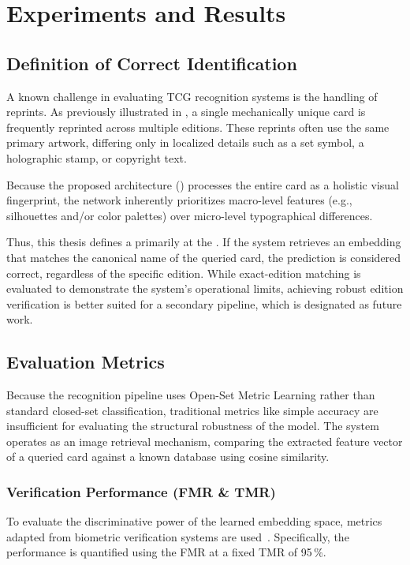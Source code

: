 \chapter{Experiments and Results}\label{chap:er}

\section{Definition of Correct Identification}\label{sec:identity_definition}
A known challenge in evaluating \ac{TCG} recognition systems is the handling of reprints. As previously illustrated in , a single mechanically unique card is frequently reprinted across multiple editions. These reprints often use the same primary artwork, differing only in localized details such as a set symbol, a holographic stamp, or copyright text.

Because the proposed architecture () processes the entire card as a holistic visual fingerprint, the network inherently prioritizes macro-level features (e.g., silhouettes and/or color palettes) over micro-level typographical differences.

Thus, this thesis defines a  primarily at the . If the system retrieves an embedding that matches the canonical name of the queried card, the prediction is considered correct, regardless of the specific edition. While exact-edition matching is evaluated to demonstrate the system's operational limits, achieving robust edition verification is better suited for a secondary pipeline, which is designated as future work.

\section{Evaluation Metrics}
Because the recognition pipeline uses Open-Set Metric Learning rather than standard closed-set classification, traditional metrics like simple accuracy are insufficient for evaluating the structural robustness of the model. The system operates as an image retrieval mechanism, comparing the extracted feature vector of a queried card against a known database using cosine similarity.

\subsection{Verification Performance (\acs{FMR} \& \acs{TMR})}
To evaluate the discriminative power of the learned embedding space, metrics adapted from biometric verification systems are used~\cite{jain2011biometrics}. Specifically, the performance is quantified using the \acf{FMR} at a fixed \acf{TMR} of 95\,\%.

